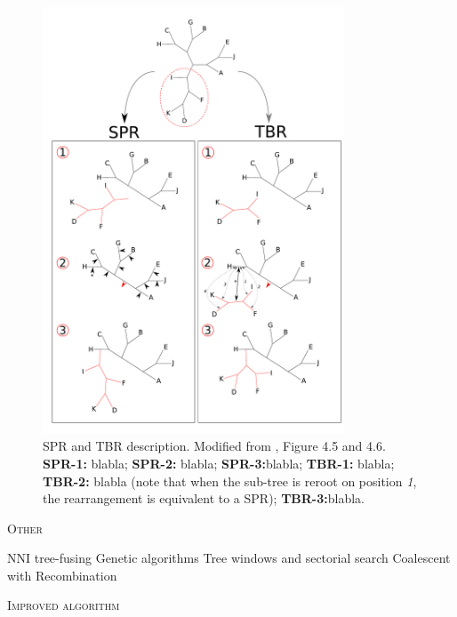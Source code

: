 \documentclass[12pt,letterpaper]{article}
\renewcommand{\section}[1]{%
\bigskip
\begin{center}
\begin{Large}
\normalfont\scshape #1
\medskip
\end{Large}
\end{center}}
\begin{document}
\begin{figure}[!htbp]
\centering
   \includegraphics[width=0.8\textwidth]{Figure/FelsensteinFigure.pdf}
\caption{\scriptsize{SPR and TBR description. Modified from \cite{felsenstein2004inferring}, Figure 4.5 and 4.6. \textbf{SPR-1:} blabla; \textbf{SPR-2:} blabla; \textbf{SPR-3:}blabla; \textbf{TBR-1:} blabla; \textbf{TBR-2:} blabla (note that when the sub-tree is reroot on position \textit{1}, the rearrangement is equivalent to a SPR); \textbf{TBR-3:}blabla.}}
\label{Figure_Felsenstein}
\end{figure}


\section{Other}
NNI
tree-fusing
Genetic algorithms
Tree windows and sectorial search
Coalescent with Recombination

\section{Improved algorithm}

\end{document}
